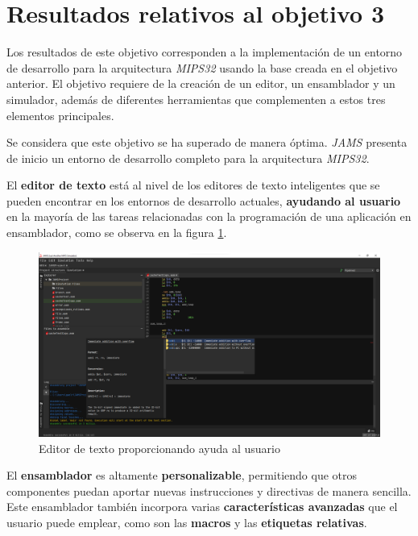 \section{Resultados relativos al objetivo 3}\label{sec:resultados-relativos-al-objetivo-3}

Los resultados de este objetivo corresponden a la implementación
de un entorno de desarrollo para la arquitectura \textit{MIPS32}
usando la base creada en el objetivo anterior.
El objetivo requiere de la creación de un editor, un ensamblador
y un simulador, además de diferentes herramientas que complementen
a estos tres elementos principales.

Se considera que este objetivo se ha superado
de manera óptima.
\textit{JAMS} presenta de inicio un entorno de desarrollo completo
para la arquitectura \textit{MIPS32}.

El \textbf{editor de texto} está al nivel de los editores de texto
inteligentes que se pueden encontrar en los entornos de desarrollo
actuales, \textbf{ayudando al usuario} en la mayoría de las tareas
relacionadas con la programación de una aplicación en ensamblador, como se observa
en la figura \ref{fig:mips-editor}.

\begin{figure}[ht]
    \centering
    \includegraphics[width=\textwidth]{images/result/mips-editor}
    \caption{Editor de texto proporcionando ayuda al usuario}
    \label{fig:mips-editor}
\end{figure}

El \textbf{ensamblador} es altamente \textbf{personalizable},
permitiendo que otros componentes puedan aportar nuevas instrucciones y
directivas de manera sencilla.
Este ensamblador también incorpora varias \textbf{características avanzadas}
que el usuario puede emplear, como son las \textbf{macros} y las
\textbf{etiquetas relativas}.

